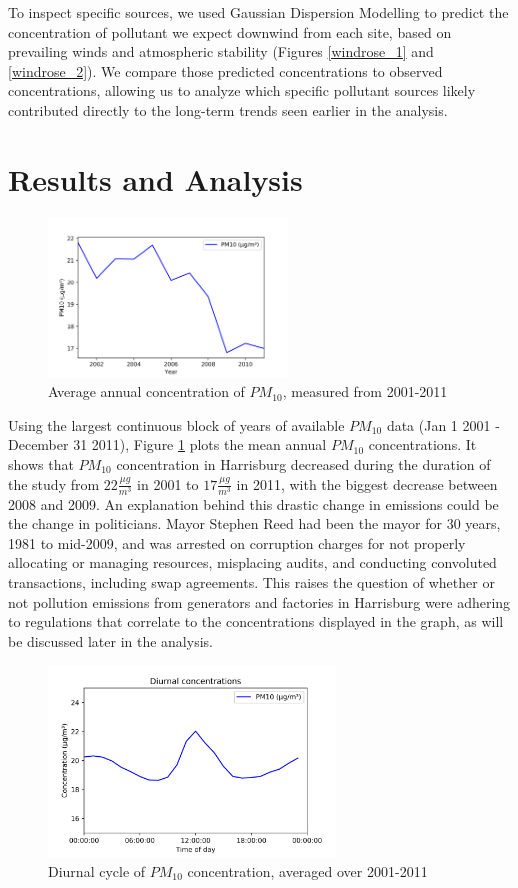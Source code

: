 \documentclass[11pt,journal]{IEEEtran}
\begin{document}
To inspect specific sources, we used Gaussian Dispersion Modelling to predict the concentration of pollutant we expect downwind from each site, based on prevailing winds and atmospheric stability (Figures \ref{windrose_1} and \ref{windrose_2}). We compare those predicted concentrations to observed concentrations, allowing us to analyze which specific pollutant sources likely contributed directly to the long-term trends seen earlier in the analysis.



\section{Results and Analysis}

\begin{figure}[!htbp]
\centering
\includegraphics[width=2.5in]{figs/years}
\caption{Average annual concentration of $PM_{10}$, measured from 2001-2011}
\label{years}
\end{figure}

Using the largest continuous block of years of available $PM_{10}$ data (Jan 1 2001 - December 31 2011), Figure \ref{years} plots the mean annual $PM_{10}$ concentrations. It shows that $PM_{10}$ concentration in Harrisburg decreased during the duration of the study from $22 \frac{\mu g}{m^3}$ in 2001 to $17 \frac{\mu g}{m^3}$ in 2011, with the biggest decrease between 2008 and 2009.
An explanation behind this drastic change in emissions could be the change in politicians. Mayor Stephen Reed had been the mayor for 30 years, 1981 to mid-2009, and was arrested on corruption charges for not properly allocating or managing resources, misplacing audits, and conducting convoluted transactions, including swap agreements. 
This raises the question of whether or not pollution emissions from generators and factories in Harrisburg were adhering to regulations that correlate to the concentrations displayed in the graph, as will be discussed later in the analysis.


\begin{figure}[!htbp]
\centering
\includegraphics[width=3in]{figs/daily}
\caption{Diurnal cycle of $PM_{10}$ concentration, averaged over 2001-2011}
\label{daily}
\end{figure}
\end{document}
